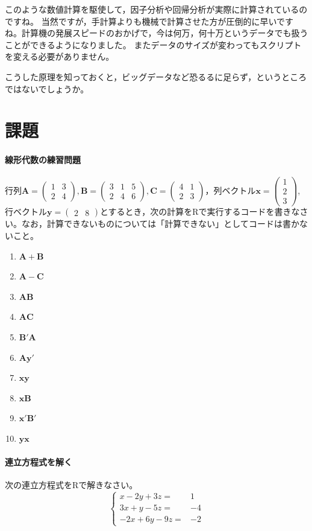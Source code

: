 \documentclass{ltjsbook}
\begin{document}
このような数値計算を駆使して，因子分析や回帰分析が実際に計算されているのですね。
当然ですが，手計算よりも機械で計算させた方が圧倒的に早いですね。計算機の発展スピードのおかげで，今は何万，何十万というデータでも扱うことができるようになりました。
またデータのサイズが変わってもスクリプトを変える必要がありません。

こうした原理を知っておくと，ビッグデータなど恐るるに足らず，というところではないでしょうか。

\section{課題}
\paragraph{線形代数の練習問題}行列$\bm{A}=\begin{pmatrix}1 & 3 \\2 & 4\end{pmatrix},\bm{B}=\begin{pmatrix}3&1&5\\2&4&6\end{pmatrix},\bm{C}=\begin{pmatrix}4&1\\2&3\end{pmatrix}$，列ベクトル$\bm{x}=\begin{pmatrix}1\\2\\3\end{pmatrix}$,行ベクトル$\bm{y}=\begin{pmatrix}2&8\end{pmatrix}$とするとき，次の計算をRで実行するコードを書きなさい。なお，計算できないものについては「計算できない」としてコードは書かないこと。
\begin{enumerate}
	\item $\bm{A}+\bm{B}$
	\item $\bm{A}-\bm{C}$
	\item $\bm{AB}$
	\item $\bm{AC}$
	\item $\bm{B}'\bm{A}$
	\item $\bm{A}\bm{y}'$
	\item $\bm{xy}$
	\item $\bm{xB}$
	\item $\bm{x}'\bm{B}'$
	\item $\bm{yx}$
\end{enumerate}

\paragraph{連立方程式を解く}次の連立方程式をRで解きなさい。
\[
	\left\{\begin{array}{rr}x-2 y+3 z= & 1 \\ 3 x+y-5 z= & -4 \\ -2 x+6 y-9 z= & -2\end{array}\right.
\]
\end{document}
